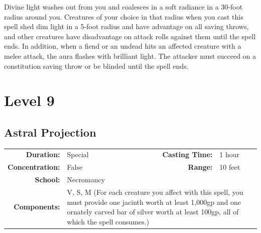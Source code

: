 \documentclass[12pt,showtrims]{memoir}
\begin{document}
\vspace{1\baselineskip}\noindent Divine light washes out from you and coalesces in a soft radiance in a 30-foot radius around you. Creatures of your choice in that radius when you cast this spell shed dim light in a 5-foot radius and have advantage on all saving throws, and other creatures have disadvantage on attack rolls against them until the spell ends. In addition, when a fiend or an undead hits an affected creature with a melee attack, the aura flashes with brilliant light. The attacker must succeed on a constitution saving throw or be blinded until the spell ends.

\newpage
\chapter*{Level 9} 
\section*{Astral Projection}

{
\small\centering\vspace{-6pt}
\begin{tabular}{rlrl}
\toprule

\textbf{Duration:} & Special &
\textbf{Casting Time:} & 1 hour \\
\textbf{Concentration:} & False &
\textbf{Range:} & 10 feet \\
\textbf{School:} & Necromancy \\
\textbf{Components:} & \multicolumn{3}{p{0.7\textwidth}}{V, S, M (For each creature you affect with this spell, you must provide one jacinth worth at least 1,000gp and one ornately carved bar of silver worth at least 100gp, all of which the spell consumes.)}\\

\bottomrule
\end{tabular}
}

\begin{figure}[p]
\end{figure}
\end{document}

